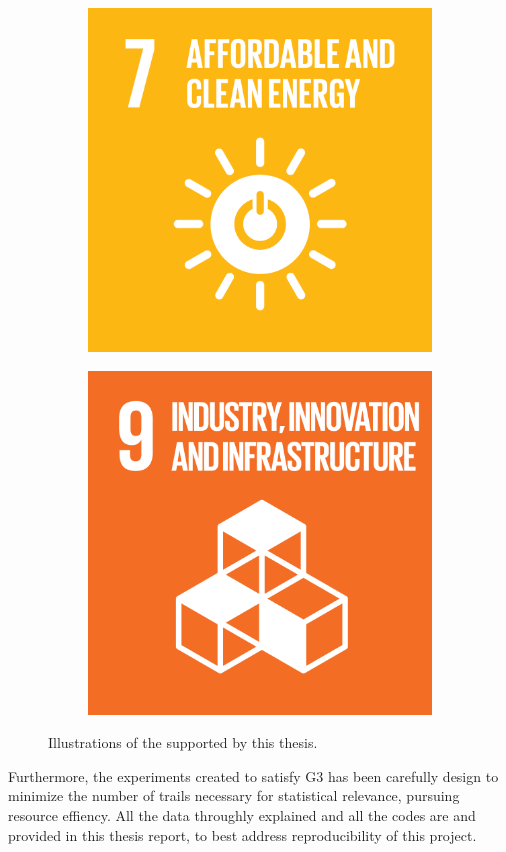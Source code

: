 \begin{figure}
    \centering
    \begin{subfigure}[b]{0.5\linewidth}
        \centering
        \includegraphics[width=0.6\linewidth]{figures/1-introduction/SDG_icons-07.png} 
        \label{fig:sdg07}
    \end{subfigure}\hfill
    \begin{subfigure}[b]{0.5\linewidth}
        \centering
        \includegraphics[width=0.6\linewidth]{figures/1-introduction/SDG_icons-09.png}
        \label{fig:sdg09}
	\end{subfigure}
	\caption[Sustainable Development Goals supported by this thesis]{Illustrations of the  supported by this thesis.}
	\label{fig:sdgs}
\end{figure}

Furthermore, the experiments created to satisfy \gls{G}3 has been carefully design to minimize the number of trails necessary for statistical relevance, pursuing resource effiency. All the data throughly explained and all the codes are and provided in this thesis report, to best address reproducibility of this project.